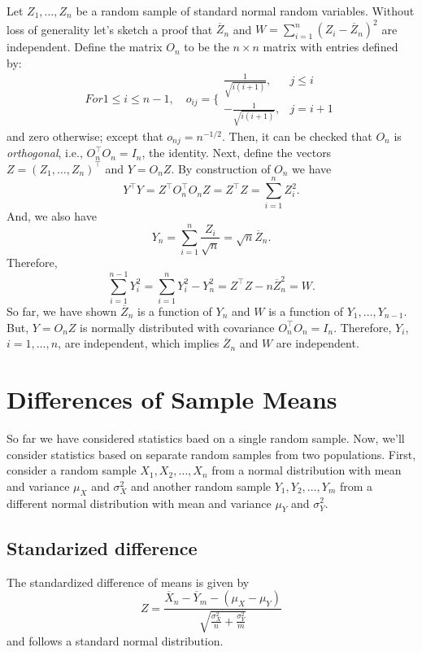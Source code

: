 \documentclass[]{book}
\begin{document}
Let \(Z_1, \ldots, Z_n\) be a random sample of standard normal random
variables. Without loss of generality let's sketch a proof that
\(\overline Z_n\) and \(W = \sum_{i=1}^n (Z_i - \overline Z_n)^2\) are
independent. Define the matrix \(O_n\) to be the \(n\times n\) matrix
with entries defined by:
\[For 1 \leq i \leq n-1, \quad o_{ij} = \Bigg\{ \begin{matrix} \frac{1}{\sqrt{i(i+1)}}, &j\leq i \\
-\frac{1}{\sqrt{i(i+1)}}, &j= i+1 
\end{matrix}\] and zero otherwise; except that \(o_{nj} = n^{-1/2}\).
Then, it can be checked that \(O_n\) is \emph{orthogonal}, i.e.,
\(O_n^\top O_n = I_n\), the identity. Next, define the vectors
\(Z = (Z_1, \ldots, Z_n)^\top\) and \(Y = O_n Z\). By construction of
\(O_n\) we have
\[Y^\top Y = Z^\top O_n^\top O_n Z = Z^\top Z = \sum_{i=1}^n Z_i^2.\]
And, we also have
\[Y_n = \sum_{i=1}^n \frac{Z_i}{\sqrt{n}} = \sqrt{n} \overline Z_n.\]
Therefore,
\[\sum_{i=1}^{n-1}Y_i^2 = \sum_{i=1}^{n}Y_i^2 - Y_n^2 = Z^\top Z - n\overline Z_n^2 = W.\]
So far, we have shown \(\overline Z_n\) is a function of \(Y_n\) and
\(W\) is a function of \(Y_1, \ldots, Y_{n-1}\). But, \(Y = O_n Z\) is
normally distributed with covariance \(O_n^\top O_n = I_n\). Therefore,
\(Y_i\), \(i=1, \ldots, n\), are independent, which implies
\(\overline Z_n\) and \(W\) are independent.

\section{Differences of Sample Means}\label{differences-of-sample-means}

So far we have considered statistics baed on a single random sample.
Now, we'll consider statistics based on separate random samples from two
populations. First, consider a random sample \(X_1, X_2, \ldots, X_{n}\)
from a normal distribution with mean and variance \(\mu_X\) and
\(\sigma_X^2\) and another random sample \(Y_1, Y_2, \ldots, Y_m\) from
a different normal distribution with mean and variance \(\mu_Y\) and
\(\sigma_Y^2\).

\subsection{Standarized difference}\label{standarized-difference}

The standardized difference of means is given by
\[Z = \frac{\overline X_n - \overline Y_m - (\mu_X - \mu_Y)}{\sqrt{\frac{\sigma_X^2}{n} + \frac{\sigma_Y^2}{m}}}\]
and follows a standard normal distribution.
\end{document}

